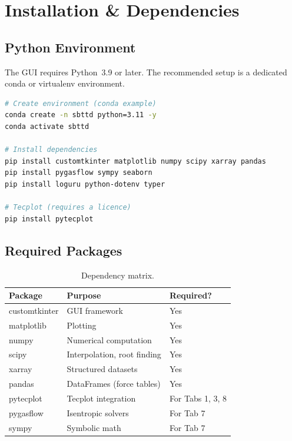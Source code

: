 \documentclass[11pt,letterpaper]{article}
\begin{document}
\section{Installation \& Dependencies}

\subsection{Python Environment}

The GUI requires Python~3.9 or later.  The recommended setup is a dedicated
conda or virtualenv environment.

\begin{lstlisting}[language=bash]
# Create environment (conda example)
conda create -n sbttd python=3.11 -y
conda activate sbttd

# Install dependencies
pip install customtkinter matplotlib numpy scipy xarray pandas
pip install pygasflow sympy seaborn
pip install loguru python-dotenv typer

# Tecplot (requires a licence)
pip install pytecplot
\end{lstlisting}

\subsection{Required Packages}

\begin{table}[h]
\centering
\begin{tabular}{lll}
\toprule
\textbf{Package} & \textbf{Purpose} & \textbf{Required?} \\
\midrule
customtkinter    & GUI framework                 & Yes \\
matplotlib       & Plotting                      & Yes \\
numpy            & Numerical computation         & Yes \\
scipy            & Interpolation, root finding   & Yes \\
xarray           & Structured datasets           & Yes \\
pandas           & DataFrames (force tables)     & Yes \\
pytecplot        & Tecplot integration           & For Tabs 1, 3, 8 \\
pygasflow        & Isentropic solvers            & For Tab 7 \\
sympy            & Symbolic math                 & For Tab 7 \\
\bottomrule
\end{tabular}
\caption{Dependency matrix.}
\end{table}
\end{document}
